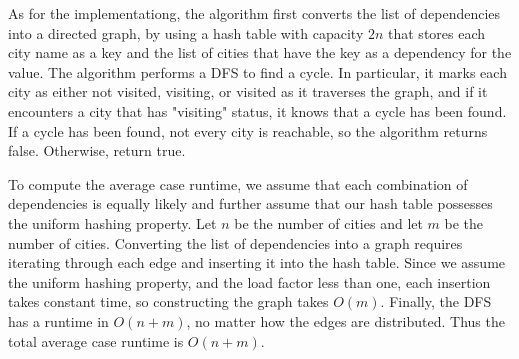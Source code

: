 \documentclass{assignment-263}
\begin{document}
\begin{enumerate}
As for the implementationg, the algorithm first converts the list of dependencies into a directed graph, by using a hash table with capacity \(2n\) that stores each city name as a key and the list of cities that have the key as a dependency for the value. The algorithm performs a DFS to find a cycle. In particular, it marks each city as either not visited, visiting, or visited as it traverses the graph, and if it encounters a city that has "visiting" status, it knows that a cycle has been found. If a cycle has been found, not every city is reachable, so the algorithm returns false. Otherwise, return true.

To compute the average case runtime, we assume that each combination of dependencies is equally likely and further assume that our hash table possesses the uniform hashing property. Let \(n\) be the number of cities and let \(m\) be the number of cities. Converting the list of dependencies into a graph requires iterating through each edge and inserting it into the hash table. Since we assume the uniform hashing property, and the load factor less than one, each insertion takes constant time, so constructing the graph takes \(O(m)\). Finally, the DFS has a runtime in \(O(n+m)\), no matter how the edges are distributed. Thus the total average case runtime is \(O(n+m)\).

\end{enumerate}
\end{document}
